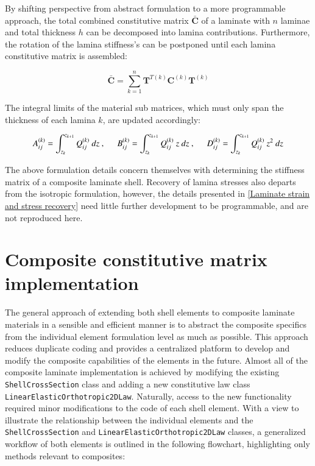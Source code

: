 By shifting perspective from abstract formulation to a more programmable approach, the total combined constitutive matrix $\bar{\mathbf{C}}$ of a laminate with $n$ laminae and total thickness $h$ can be decomposed into lamina contributions. Furthermore, the rotation of the lamina stiffness's can be postponed until each lamina constitutive matrix is assembled:

\begin{equation} 
 \bar{\mathbf{C}} = \sum_{k=1}^{n}  \mathbf{T}^{T(k)} {\mathbf{C}}^{(k)}  \mathbf{T}^{(k)}
\label{eqscomp_laminate_form3}
\end{equation}

The integral limits of the material sub matrices, which must only span the thickness of each lamina $k$, are updated accordingly:

\begin{equation} 
A_{ij}^{(k)} = 
\int_{z_k}^{z_{k+1}}
{Q}_{ij}^{(k)}
\ dz\ ,
\hspace{5mm}
B_{ij}^{(k)} = 
\int_{z_k}^{z_{k+1}}
{Q}_{ij}^{(k)}\ z
\ dz\ ,
\hspace{5mm}
D_{ij}^{(k)} = 
\int_{z_k}^{z_{k+1}}
{Q}_{ij}^{(k)}\ z^2
\ dz
\label{eqscomp_laminate_form4}
\end{equation} 

The above formulation details concern themselves with determining the stiffness matrix of a composite laminate shell. Recovery of lamina stresses also departs from the isotropic formulation, however, the details presented in \ref{Laminate strain and stress recovery} need little further development to be programmable, and are not reproduced here.

\section{Composite constitutive matrix implementation}
The general approach of extending both shell elements to composite laminate materials in a sensible and efficient manner is to abstract the composite specifics from the individual element formulation level as much as possible. This approach reduces duplicate coding and provides a centralized platform to develop and modify the composite capabilities of the elements in the future. Almost all of the composite laminate implementation is achieved by modifying the existing \texttt{ShellCrossSection} class and adding a new constitutive law class \texttt{LinearElasticOrthotropic2DLaw}. Naturally, access to the new functionality required minor modifications to the code of each shell element. With a view to illustrate the relationship between the individual elements and the \texttt{ShellCrossSection} and \texttt{LinearElasticOrthotropic2DLaw} classes, a generalized workflow of both elements is outlined in the following flowchart, highlighting only methods relevant to composites:

